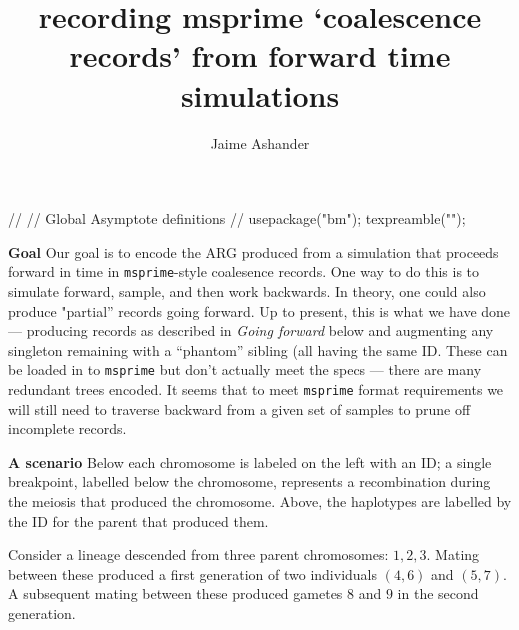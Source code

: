 \documentclass[12pt]{article}
\title{recording msprime `coalescence records' from forward time simulations}
\author{Jaime Ashander}
\date{}
\begin{document}
\maketitle

\begin{asydef}
//
// Global Asymptote definitions
//
usepackage("bm");
texpreamble("\def\V#1{\bm{#1}}");
\end{asydef}

{\bf Goal} Our goal is to encode the ARG produced  from a simulation that
proceeds forward in time in {\tt msprime}-style coalesence records.
One way to do this is to simulate forward, sample, and then work backwards.
In theory, one could also produce "partial'' records going forward.
Up to present, this is what we have done --- producing records as described in
{\it Going forward} below and augmenting any singleton remaining with a
``phantom'' sibling (all having the same ID.
These can be loaded in to {\tt msprime} but don't actually meet the specs ---
there are many redundant trees encoded.
It seems that to meet {\tt msprime} format requirements we will still need to
traverse backward from a given set of samples to prune off incomplete records.

{ \bf A scenario}
Below each chromosome is labeled on the left with an ID; a single breakpoint,
labelled below the chromosome, represents a recombination during the meiosis
that produced the chromosome.
Above, the haplotypes are labelled by the ID for the parent that produced them.

Consider a lineage descended from three parent chromosomes: $1,2,3$.
Mating between these produced a first generation of two individuals
$(4,6)$ and $(5,7)$.
A subsequent mating between these produced gametes $8$ and $9$ in the second generation.
\end{document}
